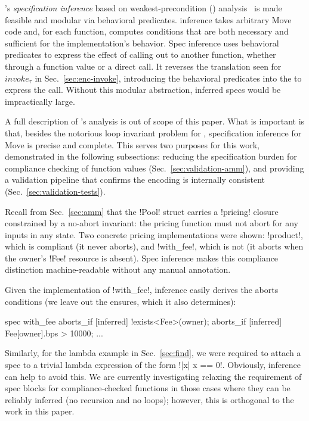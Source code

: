 \label{sec:validation-overview}

\MVP's \emph{specification inference} \cite{GrieskampEtAl26Inf} based on weakest-precondition (\WP) analysis~\cite{dijkstra1975wp,BL05} is made feasible and modular via behavioral predicates.
\WP inference takes arbitrary Move code and, for each function, computes conditions that are both necessary and sufficient for the implementation's behavior.
Spec inference uses behavioral predicates to express the effect of calling out to another function, whether through a function value or a direct call.
It reverses the translation seen for $invoke_\tau$ in Sec.~\ref{sec:enc-invoke}, introducing the behavioral predicates into the \WP to express the call. Without this modular abstraction, inferred specs would be impractically large.

A full description of \MVP's \WP analysis is out of scope of this paper. What is important is that, besides the notorious loop invariant problem for \WP, specification inference for Move is precise and complete.
This serves two purposes for this work, demonstrated in the following subsections: reducing the specification burden for compliance checking of function values (Sec.~\ref{sec:validation-amm}), and providing a validation pipeline that confirms the encoding is internally consistent (Sec.~\ref{sec:validation-tests}).

\label{sec:validation-amm}

Recall from Sec.~\ref{sec:amm} that the !Pool! struct carries a !pricing! closure constrained by a no-abort invariant: the pricing function must not abort for any inputs in any state.
Two concrete pricing implementations were shown: !product!, which is compliant (it never aborts), and !with_fee!, which is not (it aborts when the owner's !Fee! resource is absent).
Spec inference makes this compliance distinction machine-readable without any manual annotation.

Given the implementation of !with_fee!, \WP inference easily derives the aborts conditions (we leave out the ensures, which it also determines):

\begin{MoveBox}
  spec with_fee {
    aborts_if [inferred] !exists<Fee>(owner);
    aborts_if [inferred] Fee[owner].bps > 10000;
    ...
  }
\end{MoveBox}

Similarly, for the lambda example in Sec.~\ref{sec:find}, we were required to attach a spec to a trivial lambda expression of the form !|x| x == 0!.
Obviously, inference can help to avoid this.
We are currently investigating relaxing the requirement of spec blocks for compliance-checked functions in those cases where they can be reliably inferred (no recursion and no loops); however, this is orthogonal to the work in this paper.


